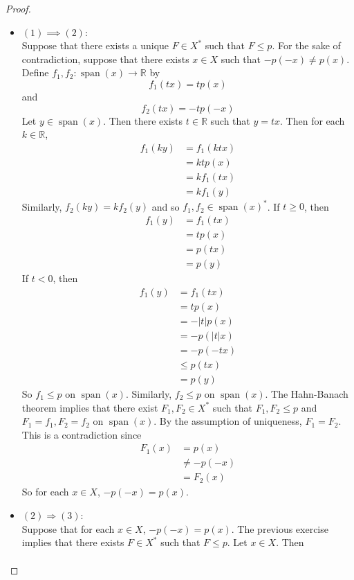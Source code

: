\documentclass[12pt]{amsart}
\theoremstyle{definition}
\newcommand{\R}{\mathbb{R}}
\DeclareMathOperator{\spn}{span}
\begin{document}
	\begin{proof} \
	\begin{itemize}
	\item $(1) \implies (2)$: \\ 
	Suppose that there exists a unique $F \in X^*$ such that $F \leq p$. For the sake of contradiction, suppose that there exists $x \in X$ such that $-p(-x) \neq p(x)$. Define $f_1,f_2: \spn(x) \rightarrow \R$ by $$f_1(tx) = t p(x)$$ and $$f_2(tx) = -tp(-x)$$ Let $y \in \spn(x)$. Then there exists $t \in \R$ such that $y = tx$. Then for each $k \in \R$,
	\begin{align*}
	f_1(ky)
	&= f_1(ktx) \\
	&= ktp(x) \\
	&= k f_1(tx) \\
	&= k f_1(y)
	\end{align*}
	Similarly, $f_2(ky) = kf_2(y)$ and so $f_1, f_2 \in \spn(x)^*$. 
	If $t \geq 0$, then 
	\begin{align*}
	f_1(y) 
	&= f_1(tx) \\
	&= tp(x) \\
	&= p(tx) \\
	&= p(y) 
	\end{align*}
	If $t <0$, then 	
	\begin{align*}
	f_1(y) 
	&= f_1(tx) \\
	&= tp(x) \\
	&= -|t|p(x) \\
	&= -p(|t|x) \\
	&= -p(-tx) \\
	& \leq p(tx) \\
	&= p(y)  
	\end{align*}
	So $f_1 \leq p$ on $\spn(x)$. Similarly, $f_2 \leq p$ on $\spn(x)$. The Hahn-Banach theorem implies that there exist $F_1, F_2 \in X^*$ such that $F_1, F_2 \leq p$ and $F_1 = f_1, F_2 = f_2$ on $\spn(x)$. By the assumption of uniqueness, $F_1 = F_2$. This is a contradiction since 
	\begin{align*}
	F_1(x) 
	&= p(x) \\
	& \neq -p(-x) \\
	& = F_2(x) 
	\end{align*}		
So for each $x \in X$, $-p(-x) = p(x)$. 
	\item $(2) \Rightarrow (3)$: \\
	Suppose that for each $x \in X$, $-p(-x) = p(x)$. The previous exercise implies that there exists $F \in X^*$ such that $F \leq p$. Let $x \in X$. Then 
	\begin{align*}

\end{align*}
\end{itemize}
\end{proof}
\end{document}

